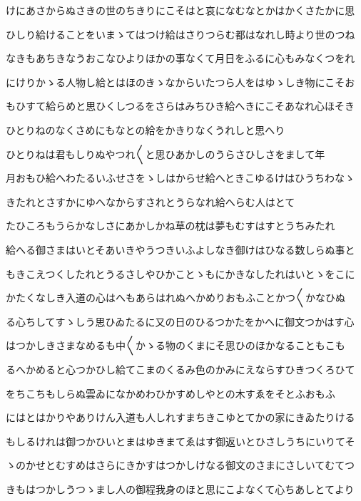 \documentclass[a4paper,11pt,landscape]{ltjtarticle}
\begin{document}
\par\medskip
けにあさからぬさきの世のちきりにこそはと哀になむなとかはかくさたかに思
\par\medskip
ひしり給けることをいまゝてはつけ給はさりつらむ都はなれし時より世のつね
\par\medskip
なきもあちきなうおこなひよりほかの事なくて月日をふるに心もみなくつをれ
\par\medskip
にけりかゝる人物し給とはほのきゝなからいたつら人をはゆゝしき物にこそお
\par\medskip
もひすて給らめと思ひくしつるをさらはみちひき給へきにこそあなれ心ほそき
\par\medskip
ひとりねのなくさめにもなとの給をかきりなくうれしと思へり
\par\medskip
ひとりねは君もしりぬやつれ〱と思ひあかしのうらさひしさをまして年
\par\medskip
月おもひ給へわたるいふせさをゝしはからせ給へときこゆるけはひうちわなゝ
\par\medskip
きたれとさすかにゆへなからすされとうらなれ給へらむ人はとて
\par\medskip
たひころもうらかなしさにあかしかね草の枕は夢もむすはすとうちみたれ
\par\medskip
給へる御さまはいとそあいきやうつきいふよしなき御けはひなる数しらぬ事と
\par\medskip
もきこえつくしたれとうるさしやひかことゝもにかきなしたれはいとゝをこに
\par\medskip
かたくなしき入道の心はへもあらはれぬへかめりおもふことかつ〱かなひぬ
\par\medskip
る心ちしてすゝしう思ひゐたるに又の日のひるつかたをかへに御文つかはす心
\par\medskip
はつかしきさまなめるも中〱かゝる物のくまにそ思ひのほかなることもこも
\par\medskip
るへかめると心つかひし給てこまのくるみ色のかみにえならすひきつくろひて
\par\medskip
をちこちもしらぬ雲ゐになかめわひかすめしやとの木すゑをそとふおもふ
\par\medskip
にはとはかりやありけん入道も人しれすまちきこゆとてかの家にきゐたりける
\par\medskip
もしるけれは御つかひいとまはゆきまてゑはす御返いとひさしうちにいりてそ
\par\medskip
ゝのかせとむすめはさらにきかすはつかしけなる御文のさまにさしいてむてつ
\par\medskip
きもはつかしうつゝまし人の御程我身のほと思にこよなくて心ちあしとてより
\par\medskip
\end{document}
